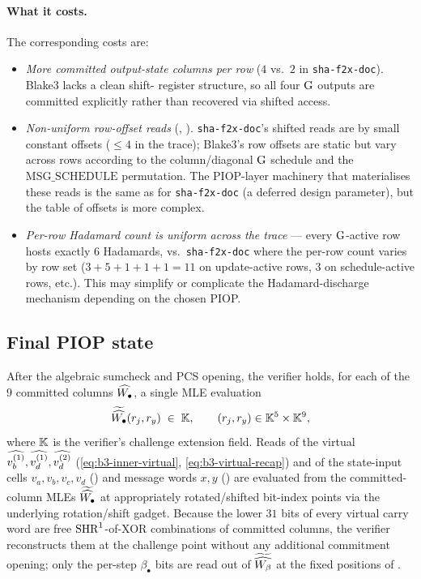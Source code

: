 \paragraph{What it costs.}
The corresponding costs are:
\begin{itemize}[leftmargin=2em,topsep=2pt]
  \item \emph{More committed output-state columns per row} ($4$
        vs.\ $2$ in \texttt{sha-f2x-doc}). Blake3 lacks a clean shift-
        register structure, so all four $\operatorname{G}$ outputs are committed
        explicitly rather than recovered via shifted access.
  \item \emph{Non-uniform row-offset reads}
        (,
        ). \texttt{sha-f2x-doc}'s shifted
        reads are by small constant offsets ($\le 4$ in the trace);
        Blake3's row offsets are static but vary across rows according
        to the column/diagonal $\operatorname{G}$ schedule and the
        $\mathrm{MSG\_SCHEDULE}$ permutation. The PIOP-layer machinery
        that materialises these reads is the same as for
        \texttt{sha-f2x-doc} (a deferred design parameter), but the
        table of offsets is more complex.
  \item \emph{Per-row Hadamard count is uniform across the trace} —
        every $\operatorname{G}$-active row hosts exactly $6$ Hadamards, vs.\
        \texttt{sha-f2x-doc} where the per-row count varies by row
        set ($3 + 5 + 1 + 1 + 1 = 11$ on update-active rows, $3$ on
        schedule-active rows, etc.). This may simplify or complicate
        the Hadamard-discharge mechanism depending on the chosen PIOP.
\end{itemize}

\subsection{Final PIOP state}

After the algebraic sumcheck and PCS opening, the verifier holds, for
each of the $9$ committed columns $\widehat{W_\bullet}$, a single MLE
evaluation
\[
\widetilde{\widehat{W_\bullet}}(r_j, r_y) \;\in\; \mathbb{K}, \qquad
(r_j, r_y) \in \mathbb{K}^{5} \times \mathbb{K}^{9},
\]
where $\mathbb{K}$ is the verifier's challenge extension field. Reads of the
virtual $\widehat{v_b^{(1)}}, \widehat{v_d^{(1)}}, \widehat{v_d^{(2)}}$
(\eqref{eq:b3-inner-virtual}, \eqref{eq:b3-virtual-recap}) and of the
state-input cells $v_a, v_b, v_c, v_d$ ()
and message words $x, y$ (\Cref{rem:b3-msg-layout}) are evaluated from
the committed-column MLEs $\widetilde{\widehat{W_\bullet}}$ at appropriately
rotated/shifted bit-index points via the underlying rotation/shift
gadget. Because the lower $31$ bits of every virtual carry word are
free $\operatorname{SHR}^{1}$-of-XOR combinations of committed columns, the verifier
reconstructs them at the challenge point without any additional
commitment opening; only the per-step $\beta_\bullet$ bits are read
out of $\widetilde{\widehat{W_\beta}}$ at the fixed positions of
.

